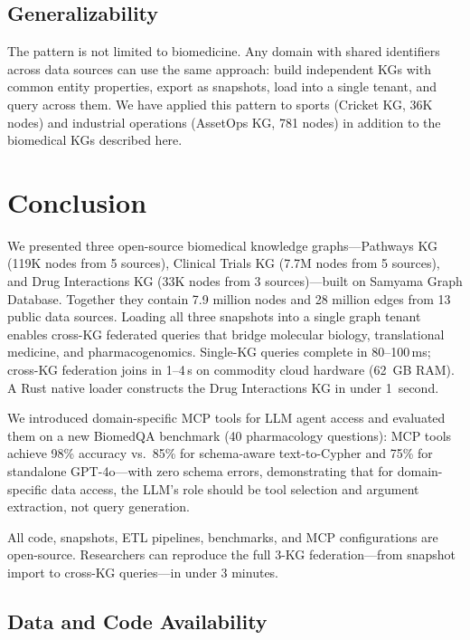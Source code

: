 \documentclass[11pt]{article}
\begin{document}
\subsection{Generalizability}

The pattern is not limited to biomedicine. Any domain with shared identifiers across data sources can use the same approach: build independent KGs with common entity properties, export as snapshots, load into a single tenant, and query across them. We have applied this pattern to sports (Cricket KG, 36K nodes) and industrial operations (AssetOps KG, 781 nodes) in addition to the biomedical KGs described here.

\section{Conclusion}

We presented three open-source biomedical knowledge graphs---Pathways KG (119K nodes from 5 sources), Clinical Trials KG (7.7M nodes from 5 sources), and Drug Interactions KG (33K nodes from 3 sources)---built on Samyama Graph Database. Together they contain 7.9 million nodes and 28 million edges from 13 public data sources. Loading all three snapshots into a single graph tenant enables cross-KG federated queries that bridge molecular biology, translational medicine, and pharmacogenomics. Single-KG queries complete in 80--100\,ms; cross-KG federation joins in 1--4\,s on commodity cloud hardware (62~GB RAM). A Rust native loader constructs the Drug Interactions KG in under 1~second.

We introduced domain-specific MCP tools for LLM agent access and evaluated them on a new BiomedQA benchmark (40 pharmacology questions): MCP tools achieve 98\% accuracy vs.\ 85\% for schema-aware text-to-Cypher and 75\% for standalone GPT-4o---with zero schema errors, demonstrating that for domain-specific data access, the LLM's role should be tool selection and argument extraction, not query generation.

All code, snapshots, ETL pipelines, benchmarks, and MCP configurations are open-source. Researchers can reproduce the full 3-KG federation---from snapshot import to cross-KG queries---in under 3 minutes.

\subsection*{Data and Code Availability}
\end{document}
